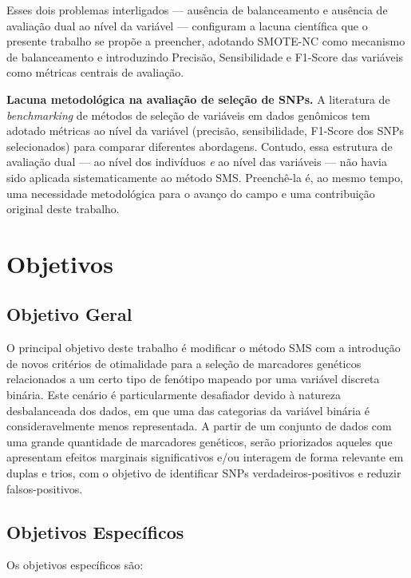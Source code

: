 \documentclass[
    12pt,
    a4paper,
    oneside,
    english,
    french,
    spanish,
    brazil
    ]{abntex2}
\newcommand{\novo}[1]{\textcolor{corNova}{#1}}
\begin{document}
\novo{Esses dois problemas interligados --- ausência de balanceamento e ausência de avaliação dual ao nível da variável --- configuram a lacuna científica que o presente trabalho se propõe a preencher, adotando SMOTE-NC como mecanismo de balanceamento e introduzindo Precisão, Sensibilidade e F1-Score das variáveis como métricas centrais de avaliação.}

\textbf{Lacuna metodológica na avaliação de seleção de SNPs.} A literatura de \textit{benchmarking} de métodos de seleção de variáveis em dados genômicos \cite{Kollipara2026} tem adotado métricas ao nível da variável (precisão, sensibilidade, F1-Score dos SNPs selecionados) para comparar diferentes abordagens. Contudo, essa estrutura de avaliação dual --- ao nível dos indivíduos \emph{e} ao nível das variáveis --- não havia sido aplicada sistematicamente ao método SMS. Preenchê-la é, ao mesmo tempo, uma necessidade metodológica para o avanço do campo e uma contribuição original deste trabalho.

\section{Objetivos}

\subsection{\textbf{Objetivo Geral}}

O principal objetivo deste trabalho é modificar o método SMS com a introdução de novos critérios de otimalidade para a seleção de marcadores genéticos relacionados a um certo tipo de fenótipo mapeado por uma variável discreta binária. Este cenário é particularmente desafiador devido à natureza desbalanceada dos dados, em que uma das categorias da variável binária é consideravelmente menos representada. A partir de um conjunto de dados com uma grande quantidade de marcadores genéticos, serão priorizados aqueles que apresentam efeitos marginais significativos e/ou interagem de forma relevante em duplas e trios, com o objetivo de identificar SNPs verdadeiros-positivos e reduzir falsos-positivos.

\subsection{\textbf{Objetivos Específicos}}

Os objetivos específicos são:
\end{document}
